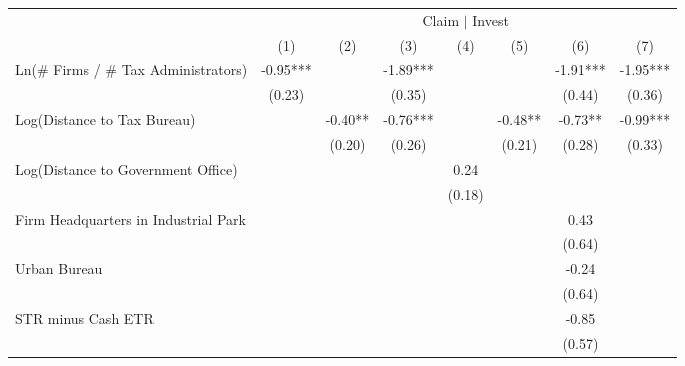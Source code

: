\begin{tabular}{lccccccc}
\toprule
                    &\multicolumn{7}{c}{Claim $\mid$ Invest }                                                                       \\\cmidrule(lr){2-8}
                    &         (1)   &         (2)   &         (3)   &         (4)   &         (5)   &         (6)   &         (7)   \\
\midrule
Ln(\# Firms / \# Tax Administrators)&       -0.95***&               &       -1.89***&               &               &       -1.91***&       -1.95***\\
                    &      (0.23)   &               &      (0.35)   &               &               &      (0.44)   &      (0.36)   \\
\addlinespace
Log(Distance to Tax Bureau)&               &       -0.40** &       -0.76***&               &       -0.48** &       -0.73** &       -0.99***\\
                    &               &      (0.20)   &      (0.26)   &               &      (0.21)   &      (0.28)   &      (0.33)   \\
\addlinespace
Log(Distance to Government Office)&               &               &               &        0.24   &               &               &               \\
                    &               &               &               &      (0.18)   &               &               &               \\
\addlinespace
Firm Headquarters in Industrial Park&               &               &               &               &               &        0.43   &               \\
                    &               &               &               &               &               &      (0.64)   &               \\
\addlinespace
Urban Bureau        &               &               &               &               &               &       -0.24   &               \\
                    &               &               &               &               &               &      (0.64)   &               \\
\addlinespace
STR minus Cash ETR  &               &               &               &               &               &       -0.85   &               \\
                    &               &               &               &               &               &      (0.57)   &               \\

\end{tabular}
